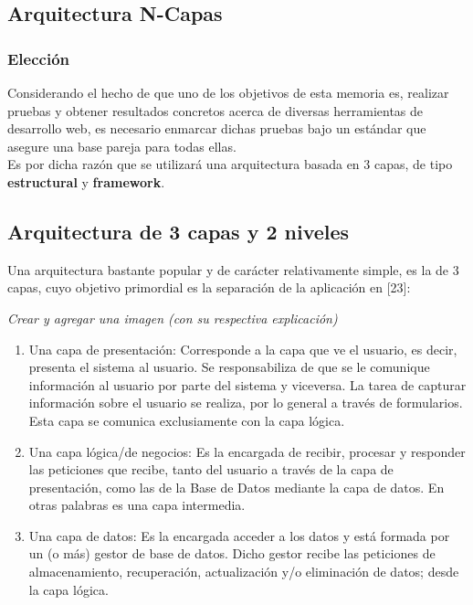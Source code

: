    
\subsection{Arquitectura N-Capas}

%


\subsubsection{Elección}

Considerando el hecho de que uno de los objetivos de esta memoria es, realizar pruebas y obtener
resultados concretos acerca de diversas herramientas de desarrollo web, es necesario enmarcar
dichas pruebas bajo un estándar que asegure una base pareja para todas ellas.\\

Es por dicha razón que se utilizará una arquitectura basada en 3 capas, de tipo \textbf{estructural} y 
\textbf{framework}.\\

\subsection{Arquitectura de 3 capas y 2 niveles}
Una arquitectura bastante popular y de carácter relativamente simple, es la de 3 capas, cuyo
objetivo primordial es la separación de la aplicación en [23]:

\textit{Crear y agregar una imagen (con su respectiva explicación)}\\

\begin{enumerate}
 \item Una capa de presentación: Corresponde a la capa que ve el usuario, es decir, presenta 
  el sistema al usuario. Se responsabiliza de que se le comunique información al usuario por 
  parte del sistema y viceversa. La tarea de capturar información sobre el usuario se realiza,
  por lo general a través de formularios. Esta capa se comunica exclusiamente con la capa lógica.
  
 \item Una capa lógica/de negocios: Es la encargada de recibir, procesar y responder las peticiones
  que recibe, tanto del usuario a través de la capa de presentación, como las de la Base de Datos mediante
  la capa de datos. En otras palabras es una capa intermedia.
 
 \item Una capa de datos: Es la encargada acceder a los datos y está formada por un (o más) gestor de 
  base de datos. Dicho gestor recibe las peticiones de almacenamiento, recuperación, actualización y/o 
  eliminación de datos; desde la capa lógica. 
\end{enumerate}

